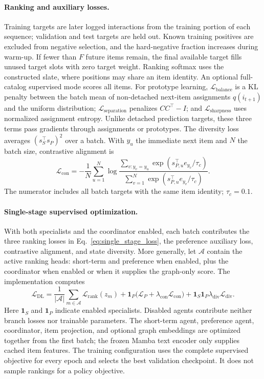 \documentclass[11pt]{article}
\begin{document}
\paragraph{Ranking and auxiliary losses.}
Training targets are later logged interactions from the training portion of each sequence; validation and test targets are held out. Known training positives are excluded from negative selection, and the hard-negative fraction increases during warm-up. If fewer than $F$ future items remain, the final available target fills unused target slots with zero target weight. Ranking softmax uses the constructed slate, where positions may share an item identity. An optional full-catalog supervised mode scores all items. For prototype learning, $\mathcal L_{\mathrm{balance}}$ is a KL penalty between the batch mean of non-detached next-item assignments $q(i_{t+1})$ and the uniform distribution; $\mathcal L_{\mathrm{separation}}$ penalizes $CC^\top-I$; and $\mathcal L_{\mathrm{sharpness}}$ uses normalized assignment entropy. Unlike detached prediction targets, these three terms pass gradients through assignments or prototypes. The diversity loss averages $(s_S^\top s_P)^2$ over a batch. With $y_u$ the immediate next item and $N$ the batch size, contrastive alignment is
\begin{equation}
 \mathcal L_{\mathrm{con}}=-\frac{1}{N}\sum_{u=1}^{N}
 \log\frac{\sum_{v:y_v=y_u}\exp(s_{P,u}^\top e_{y_v}/\tau_c)}
 {\sum_{v=1}^{N}\exp(s_{P,u}^\top e_{y_v}/\tau_c)}.
\end{equation}
The numerator includes all batch targets with the same item identity; $\tau_c=0.1$.

\paragraph{Single-stage supervised optimization.}
With both specialists and the coordinator enabled, each batch contributes the three ranking losses in Eq.~\eqref{eq:single_stage_loss}, the preference auxiliary loss, contrastive alignment, and state diversity. More generally, let $\mathcal A$ contain the active ranking heads: short-term and preference when enabled, plus the coordinator when enabled or when it supplies the graph-only score. The implementation computes
\begin{equation}
 \mathcal L_{\mathrm{DL}}=\frac{1}{|\mathcal A|}\sum_{m\in\mathcal A}\mathcal L_{\mathrm{rank}}(z_m)
 +\mathbf 1_P\bigl(\mathcal L_P+\lambda_{\mathrm{con}}\mathcal L_{\mathrm{con}}\bigr)
 +\mathbf 1_S\mathbf 1_P\lambda_{\mathrm{div}}\mathcal L_{\mathrm{div}}.
\end{equation}
Here $\mathbf 1_S$ and $\mathbf 1_P$ indicate enabled specialists. Disabled agents contribute neither branch losses nor trainable parameters. The short-term agent, preference agent, coordinator, item projection, and optional graph embeddings are optimized together from the first batch; the frozen Mamba text encoder only supplies cached item features. The training configuration uses the complete supervised objective for every epoch and selects the best validation checkpoint. It does not sample rankings for a policy objective.
\end{document}
